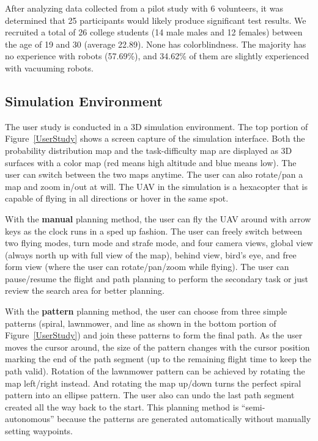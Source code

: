 \documentclass[journal]{IEEEtran}
\begin{document}
After analyzing data collected from a pilot study with 6 volunteers, it was determined that 25 participants would likely produce significant test results. We recruited a total of 26 college students (14 male males and 12 females) between the age of 19 and 30 (average 22.89). None has colorblindness. The majority has no experience with robots (57.69\%), and 34.62\% of them are slightly experienced with vacuuming robots.

\subsection{Simulation Environment}

The user study is conducted in a 3D simulation environment. The top portion of Figure~\ref{UserStudy} shows a screen capture of the simulation interface. Both the probability distribution map and the task-difficulty map are displayed as 3D surfaces with a color map (red means high altitude and blue means low). The user can switch between the two maps anytime. The user can also rotate/pan a map and zoom in/out at will. The UAV in the simulation is a hexacopter that is capable of flying in all directions or hover in the same spot.

With the \textbf{manual} planning method, the user can fly the UAV around with arrow keys as the clock runs in a sped up fashion. The user can freely switch between two flying modes, turn mode and strafe mode, and four camera views, global view (always north up with full view of the map), behind view, bird's eye, and free form view (where the user can rotate/pan/zoom while flying). The user can pause/resume the flight and path planning to perform the secondary task or just review the search area for better planning.

With the \textbf{pattern} planning method, the user can choose from three simple patterns (spiral, lawnmower, and line as shown in the bottom portion of Figure~\ref{UserStudy}) and join these patterns to form the final path. As the user moves the cursor around, the size of the pattern changes with the cursor position marking the end of the path segment (up to the remaining flight time to keep the path valid). Rotation of the lawnmower pattern can be achieved by rotating the map left/right instead. And rotating the map up/down turns the perfect spiral pattern into an ellipse pattern. The user also can undo the last path segment created all the way back to the start. This planning method is ``semi-autonomous'' because the patterns are generated automatically without manually setting waypoints.
\end{document}
